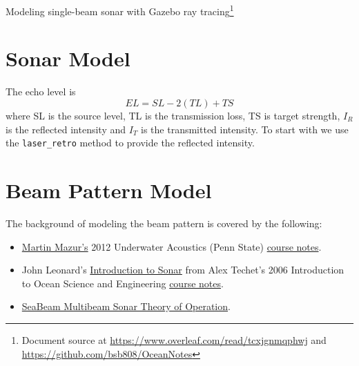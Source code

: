 \documentclass[11pt]{article}
\newcommand{\doctitle}{Modeling single-beam sonar with Gazebo ray tracing}
\begin{document}
\setlength{\IEEEnormaljot}{10pt}%


\newcommand{\SF}{0.7}
\newcommand{\SFb}{0.45}
\newcommand{\SFPic}{0.45}
\newcommand{\SFPlot}{0.45}
\newcommand{\SFc}{0.52}
\newcommand{\FigWidth}{\SF}


\newpage
\setcounter{page}{1}
\begin{center}
{\huge \doctitle}\footnote{Document source at \url{https://www.overleaf.com/read/tcxjgnmqphwj} and \url{https://github.com/bsb808/OceanNotes}}
\end{center}


\section{Sonar Model}

The echo level is
\begin{equation}
EL = SL - 2(TL)+ TS %
\end{equation}
where SL is the source level, TL is the transmission loss, TS is target strength, $I_R$ is the reflected intensity and $I_T$ is the transmitted intensity.  To start with we use the \verb+laser_retro+ method to provide the reflected intensity.

\section{Beam Pattern Model}

The background of modeling the beam pattern is covered by the following:
\begin{itemize}
\item \href{http://www.personal.psu.edu/faculty/m/x/mxm14/}{Martin Mazur's} 2012 Underwater Acoustics (Penn State) \href{http://www.personal.psu.edu/faculty/m/x/mxm14/sonar/Mazur-sonar_signal_processing_combined.pdf}{course notes}.
\item John Leonard's \href{https://ocw.mit.edu/courses/mechanical-engineering/2-011-introduction-to-ocean-science-and-engineering-spring-2006/readings/hw5_sonar_leonar.pdf}{Introduction to Sonar} from Alex Techet's 2006 Introduction to Ocean Science and Engineering \href{https://ocw.mit.edu/courses/mechanical-engineering/2-011-introduction-to-ocean-science-and-engineering-spring-2006/}{course notes}.
\item \href{https://www3.mbari.org/data/mbsystem/sonarfunction/SeaBeamMultibeamTheoryOperation.pdf}{SeaBeam Multibeam Sonar Theory of Operation}.
\end{itemize}
\end{document}
